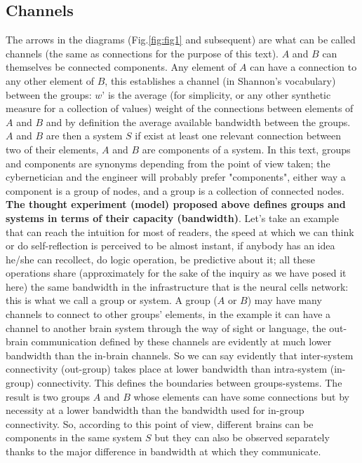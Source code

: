 \documentclass[14pt,a4paper]{extarticle}
\begin{document}
\subsection*{Channels}
\label{subsec:channels}
\hspace*{15mm}The arrows in the diagrams (Fig.\ref{fig:fig1} and subsequent) are what can be called channels (the same as connections for the purpose of this text).
\newline
\hspace*{15mm}\(A\) and \(B\) can themselves be connected components. Any element of \(A\) can have a connection to any other element of \(B\), this establishes a channel (in Shannon’s vocabulary) between the groups: \(w’\) is the average (for simplicity, or any other synthetic measure for a collection of values) weight of the connections between elements of \(A\) and \(B\) and by definition the average available bandwidth between the groups.
\newline
\hspace*{15mm}\(A\) and \(B\) are then a system \(S\) if exist at least one relevant connection between two of their elements, \(A\) and \(B\) are components of a system.
\newline 
\hspace*{15mm}In this text, groups and components are synonyms depending from the point of view taken; the cybernetician and the engineer will probably prefer "components", either way a component is a group of nodes, and a group is a collection of connected nodes.
\textbf{The thought experiment (model) proposed above defines groups and systems in terms of their capacity (bandwidth)}.
\newline
\hspace*{15mm}Let's take an example that can reach the intuition for most of readers, the speed at which we can think or do self-reflection is perceived to be almost instant, if anybody has an idea he/she can recollect, do logic operation, be predictive about it; all these operations share (approximately for the sake of the inquiry as we have posed it here) the same bandwidth in the infrastructure that is the neural cells network: this is what we call a group or system.
A group (\(A\) or \(B\)) may have many channels to connect to other groups' elements, in the example it can have a channel to another brain system through the way of sight or language, the out-brain communication defined by these channels are evidently at much lower bandwidth than the in-brain channels. So we can say evidently that inter-system connectivity (out-group) takes place at lower bandwidth than intra-system (in-group) connectivity.
This defines the boundaries between groups-systems. The result is two groups \(A\) and \(B\) whose elements can have some connections but by necessity at a lower bandwidth than the bandwidth used for in-group connectivity. So, according to this point of view, different brains can be components in the same system \(S\) but they can also be observed separately thanks to the major difference in bandwidth at which they communicate.
\end{document}

